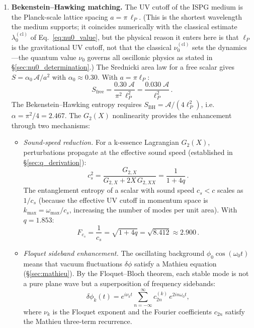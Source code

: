 \documentclass[11pt]{article}
\begin{document}
\begin{enumerate}
\item \textbf{Bekenstein--Hawking matching.}\;
The UV cutoff of the ISPG medium is the
Planck-scale lattice spacing
$a = \pi\,\ell_P$.
(This is the shortest wavelength the medium
supports; it coincides numerically with the
classical estimate $\lambda_0^{(\mathrm{cl})}$
of Eq.~\ref{eq:nu0_value}, but the physical
reason it enters here is that $\ell_P$ is the
gravitational UV cutoff, not that the classical
$\nu_0^{(\mathrm{cl})}$ sets the dynamics---the
quantum value $\nu_0$ governs all oscillonic
physics as stated in
\S\ref{sec:nu0_determination}.)
The Srednicki area law for a free scalar gives
$S = \alpha_0\,\mathcal{A} / a^2$ with
$\alpha_0 \approx 0.30$.  With $a = \pi\ell_P$:
\begin{equation}\label{eq:S_ent_free}
  S_{\mathrm{free}}
  = \frac{0.30\;\mathcal{A}}{\pi^2\,\ell_P^2}
  = \frac{0.030\;\mathcal{A}}{\ell_P^2}\,.
\end{equation}
The Bekenstein--Hawking entropy requires
$S_{\mathrm{BH}} = \mathcal{A}/(4\ell_P^2)$,
i.e.\ $\alpha = \pi^2/4 = 2.467$.  The
$G_2(X)$ nonlinearity provides the enhancement
through two mechanisms:
\begin{itemize}
  \item \textit{Sound-speed reduction.}\;
    For a k-essence Lagrangian $G_2(X)$,
    perturbations propagate at the effective
    sound speed (established in \S\ref{sec:q_derivation}):
    \begin{equation}\label{eq:cs_ent}
      c_s^2 = \frac{G_{2,X}}{G_{2,X} + 2X\,G_{2,XX}}
      = \frac{1}{1 + 4q}\,.
    \end{equation}
    The entanglement entropy of a scalar with
    sound speed $c_s < c$ scales as $1/c_s$
    (because the effective UV cutoff in momentum
    space is $k_{\max} = \omega_{\max}/c_s$,
    increasing the number of modes per unit area).
    With $q = 1.853$:
    \begin{equation}\label{eq:Fcs}
      F_{c_s}
      = \frac{1}{c_s}
      = \sqrt{1 + 4q}
      = \sqrt{8.412}
      \approx 2.900\,.
    \end{equation}

  \item \textit{Floquet sideband enhancement.}\;
    The oscillating background
    $\phi_0\cos(\omega_0 t)$ means that vacuum
    fluctuations $\delta\phi$ satisfy a Mathieu
    equation (\S\ref{sec:mathieu}).  By the
    Floquet--Bloch theorem, each stable mode is
    not a pure plane wave but a superposition of
    frequency sidebands:
    \begin{equation}\label{eq:floquet_expansion}
      \delta\phi_k(t)
      = e^{i\nu_k t}\!\sum_{n=-\infty}^{\infty}
      c_{2n}^{(k)}\,e^{2in\omega_0 t},
    \end{equation}
    where $\nu_k$ is the Floquet exponent and the
    Fourier coefficients $c_{2n}$ satisfy the
    Mathieu three-term recurrence.


\end{itemize}
\end{enumerate}
\end{document}
